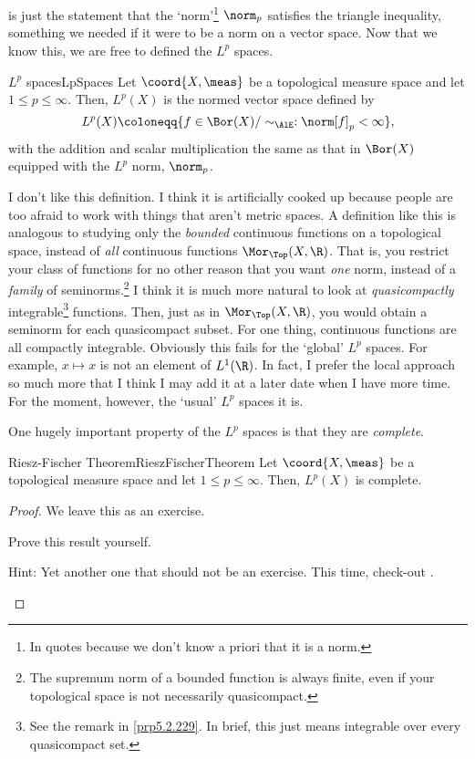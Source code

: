  is just the statement that the `norm'\footnote{In quotes because we don't know a priori that it is a norm.} $\norm _p$ satisfies the triangle inequality, something we needed if it were to be a norm on a vector space.  Now that we know this, we are free to defined the $L^p$ spaces.
\begin{dfn}{$L^p$ spaces}{LpSpaces}
Let $\coord{X,\meas}$ be a topological measure space and let $1\leq p\leq \infty$.  Then, $L^p(X)$ is the normed vector space defined by
\begin{equation}
L^p(X)\coloneqq \{ f\in \Bor (X)/\sim _{\AlE}:\norm[f]_p<\infty \} ,
\end{equation}
with the addition and scalar multiplication the same as that in $\Bor (X)$ equipped with the $L^p$ norm, $\norm _p$.
\begin{rmk}
I don't like this definition.  I think it is artificially cooked up because people are too afraid to work with things that aren't metric spaces.  A definition like this is analogous to studying only the \emph{bounded} continuous functions on a topological space, instead of \emph{all} continuous functions $\Mor _{\Top}(X,\R )$.  That is, you restrict your class of functions for no other reason that you want \emph{one} norm, instead of a \emph{family} of seminorms.\footnote{The supremum norm of a bounded function is always finite, even if your topological space is not necessarily quasicompact.}  I think it is much more natural to look at \emph{quasicompactly} integrable\footnote{See the remark in \cref{prp5.2.229}.  In brief, this just means integrable over every quasicompact set.} functions.  Then, just as in $\Mor _{\Top}(X,\R )$, you would obtain a seminorm for each quasicompact subset.  For one thing, continuous functions are all compactly integrable.  Obviously this fails for the `global' $L^p$ spaces.  For example, $x\mapsto x$ is not an element of $L^1(\R )$.  In fact, I prefer the local approach so much more that I think I may add it at a later date when I have more time.  For the moment, however, the `usual' $L^p$ spaces it is.
\end{rmk}
\end{dfn}
One hugely important property of the $L^p$ spaces is that they are \emph{complete}.
\begin{thm}{Riesz-Fischer Theorem}{RieszFischerTheorem}
Let $\coord{X,\meas}$ be a topological measure space and let $1\leq p\leq \infty$.  Then, $L^p(X)$ is complete.
\begin{proof}
We leave this as an exercise.
\begin{exr}[breakable=false]{}{}
Prove this result yourself.
\begin{rmk}
Hint:  Yet another one that should not be an exercise.  This time, check-out \cite[pg.~70]{Stein}.
\end{rmk}
\end{exr}
\end{proof}
\end{thm}
